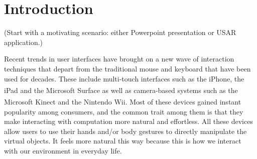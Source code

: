 \chapter{Introduction}
(Start with a motivating scenario: either Powerpoint presentation or USAR
application.)
% 
% 

Recent trends in user interfaces have brought on a new wave of interaction
techniques that depart from the traditional mouse and keyboard that have been 
used for decades. These include multi-touch interfaces such as the 
iPhone, the iPad and the Microsoft 
Surface\textsuperscript{\textregistered} as well as camera-based systems such as
the Microsoft Kinect and the Nintendo\textsuperscript{\textregistered} Wii. Most
of these devices gained instant popularity among consumers, and the common trait
among them is that they make interacting with computation more natural and 
effortless. All these devices allow users to use their hands and/or body 
gestures to directly manipulate the virtual objects. It feels more natural this 
way because this is how we interact with our environment in everyday life.
 
